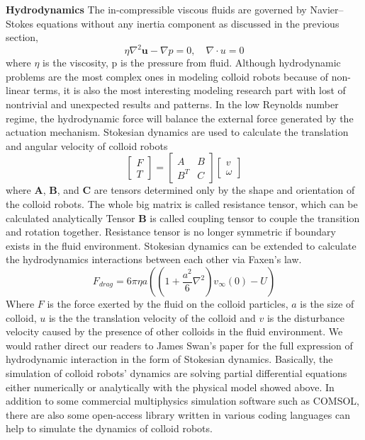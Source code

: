 \textbf{Hydrodynamics}  The in-compressible viscous fluids are governed by Navier–Stokes equations without any inertia component as discussed in the previous section,
\begin{equation}
    \eta \nabla^2\textbf{u}-\nabla p=0,\quad \nabla \cdot u=0
\end{equation}
where $\eta$ is the viscosity, p is the pressure from fluid. Although hydrodynamic problems are the most complex ones in modeling colloid robots because of non-linear terms, it is also the most interesting modeling research part with lost of  nontrivial and unexpected results and patterns. \cite{Lauga2009,berke2008hydrodynamic,lauga2011life} In the low Reynolds number regime, the hydrodynamic force will balance the external force generated by the actuation mechanism. Stokesian dynamics are used to calculate the  translation and angular velocity of colloid robots \cite{Brady1988a,Kim2005}
\begin{equation}
    \left[ \begin{array}{c} F \\ T \end{array} \right] = \begin{bmatrix} A & B \\ B^T & C \end{bmatrix} \left[ \begin{array}{c} v \\ \omega \end{array} \right]
\end{equation}
where \textbf{A}, \textbf{B}, and \textbf{C} are tensors determined only by the shape and orientation of the colloid robots. The whole big matrix is called resistance tensor, which can be calculated analytically\cite{Kim2005}  Tensor \textbf{B} is called coupling tensor to couple the transition and rotation together. Resistance tensor is no longer symmetric if boundary exists in the fluid environment.  Stokesian dynamics  can be extended to calculate the hydrodynamics interactions between each other via Faxen's law.
\begin{equation}
    F_{drag}=6 \pi \eta a((1+\frac{a^2}{6}\nabla^2)v_{\infty}(0)-U)
\end{equation}
Where $F$ is the   force exerted by the fluid on the colloid particles, $a$ is the size of colloid, $u$ is the  the translation  velocity of the colloid and $v$ is the disturbance velocity caused by the presence of other colloids in the fluid environment. We would rather direct our readers to James Swan's paper for the full expression of hydrodynamic interaction in the form of Stokesian dynamics. \cite{swan2011modeling} Basically, the simulation of colloid robots' dynamics are solving partial differential equations either numerically or analytically with the physical model showed above. In addition to some commercial multiphysics simulation software such as COMSOL\textregistered, there are also some open-access library written in various coding languages  can help to simulate the dynamics of colloid robots. \cite{glaser2015strong,anderson2008general,swan2011modeling,singh2019hydrodynamic}

